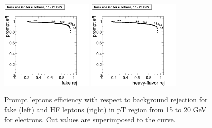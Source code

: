 \begin{figure}[htbp]
\begin{center}

 \includegraphics[width = 0.4\textwidth]{pictures/bkgdRej_sigEff/onlyTrack_elec_fake_ptCut2_ptCut3.png}
\includegraphics[width = 0.4\textwidth]{pictures/bkgdRej_sigEff/onlyTrack_elec_nonPrompt_ptCut2_ptCut3.png}
\caption{\small{Prompt leptons efficiency with respect to background 
rejection for fake (left) and HF leptons (right) in pT region
from 15 to 20 GeV for electrons. 
Cut values are superimposed to the curve.}\label{fig:rej_el3}}
\end{center}
\end{figure}

